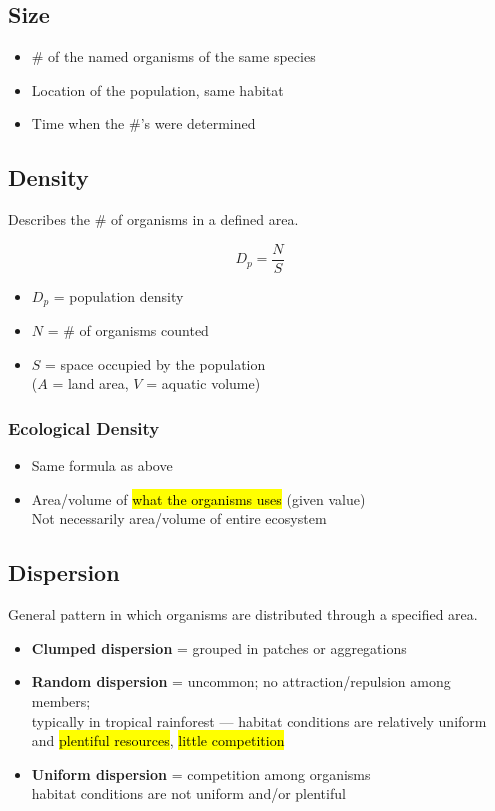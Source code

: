 \documentclass[a4paper,12pt]{article}
\begin{document}
\subsection{Size}
\begin{itemize}
    \item{\# of the named organisms of the same species}
    \item{Location of the population, same habitat}
    \item{Time when the \#'s were determined}
\end{itemize}

\subsection{Density}
Describes the \# of organisms in a defined area.

\Huge
$$D_p = \frac{N}{S}$$
\normalsize
\begin{itemize}
    \item{$D_p$ = population density}
    \item{$N$ = \# of organisms counted}
    \item{$S$ = space occupied by the population \\ ($A$ = land area, $V$ = aquatic volume)}
\end{itemize}

\subsubsection{Ecological Density}
\begin{itemize}
    \item{Same formula as above}
    \item{Area/volume of \hl{what the organisms uses} (given value) \\ Not necessarily area/volume of entire ecosystem}
\end{itemize}

\subsection{Dispersion}
General pattern in which organisms are distributed through a specified area.
\begin{itemize}
    \item{\textbf{Clumped dispersion} = grouped in patches or aggregations}
    \item{\textbf{Random dispersion} = uncommon; no attraction/repulsion among members; \\ typically in tropical rainforest --- habitat conditions are relatively uniform and \hl{plentiful resources}, \hl{little competition}}
    \item{\textbf{Uniform dispersion} = competition among organisms \\ habitat conditions are not uniform and/or plentiful}
\end{itemize}
\end{document}
